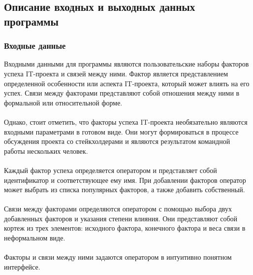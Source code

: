 \documentclass{article}
\begin{document}
    \subsection {Описание входных и выходных данных программы}
    \subsubsection{Входные данные}
    Входными данными для программы являются пользовательские наборы факторов успеха IT-проекта и связей между ними. Фактор является представлением определенной особенности или аспекта IT-проекта, который может влиять на его успех. Связи между факторами представляют собой отношения между ними в формальной или относительной форме.\\
    ~\\
    Однако, стоит отметить, что факторы успеха IT-проекта необязательно являются входными параметрами в готовом виде. Они могут формироваться в процессе обсуждения проекта со стейкхолдерами и являются результатом командной работы нескольких человек.\\
    ~\\
    Каждый фактор успеха определяется оператором и представляет собой идентификатор и соответствующее ему имя. При добавлении факторов оператор может выбрать из списка популярных факторов, а также добавить собственный.\\
    ~\\
    Связи между факторами определяются оператором с помощью выбора двух добавленных факторов и указания степени влияния. Они представляют собой кортеж из трех элементов: исходного фактора, конечного фактора и веса связи в неформальном виде.\\
    ~\\
    Факторы и связи между ними задаются оператором в интуитивно понятном интерфейсе.
\end{document}
